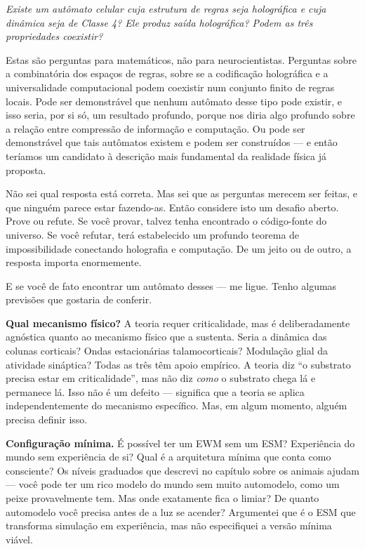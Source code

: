 \documentclass[11pt, twoside, openright]{book}
\begin{document}
\textit{Existe um autômato celular cuja estrutura de regras seja holográfica e cuja dinâmica seja de Classe 4? Ele produz saída holográfica? Podem as três propriedades coexistir?}

Estas são perguntas para matemáticos, não para neurocientistas. Perguntas sobre a combinatória dos espaços de regras, sobre se a codificação holográfica e a universalidade computacional podem coexistir num conjunto finito de regras locais. Pode ser demonstrável que nenhum autômato desse tipo pode existir, e isso seria, por si só, um resultado profundo, porque nos diria algo profundo sobre a relação entre compressão de informação e computação. Ou pode ser demonstrável que tais autômatos existem e podem ser construídos --- e então teríamos um candidato à descrição mais fundamental da realidade física já proposta.

Não sei qual resposta está correta. Mas sei que as perguntas merecem ser feitas, e que ninguém parece estar fazendo-as. Então considere isto um desafio aberto. Prove ou refute. Se você provar, talvez tenha encontrado o código-fonte do universo. Se você refutar, terá estabelecido um profundo teorema de impossibilidade conectando holografia e computação. De um jeito ou de outro, a resposta importa enormemente.

E se você de fato encontrar um autômato desses --- me ligue. Tenho algumas previsões que gostaria de conferir.

\textbf{Qual mecanismo físico?} A teoria requer criticalidade, mas é deliberadamente agnóstica quanto ao mecanismo físico que a sustenta. Seria a dinâmica das colunas corticais? Ondas estacionárias talamocorticais? Modulação glial da atividade sináptica? Todas as três têm apoio empírico. A teoria diz ``o substrato precisa estar em criticalidade'', mas não diz \textit{como} o substrato chega lá e permanece lá. Isso não é um defeito --- significa que a teoria se aplica independentemente do mecanismo específico. Mas, em algum momento, alguém precisa definir isso.

\textbf{Configuração mínima.} É possível ter um EWM sem um ESM? Experiência do mundo sem experiência de si? Qual é a arquitetura mínima que conta como consciente? Os níveis graduados que descrevi no capítulo sobre os animais ajudam --- você pode ter um rico modelo do mundo sem muito automodelo, como um peixe provavelmente tem. Mas onde exatamente fica o limiar? De quanto automodelo você precisa antes de a luz se acender? Argumentei que é o ESM que transforma simulação em experiência, mas não especifiquei a versão mínima viável.
\end{document}
